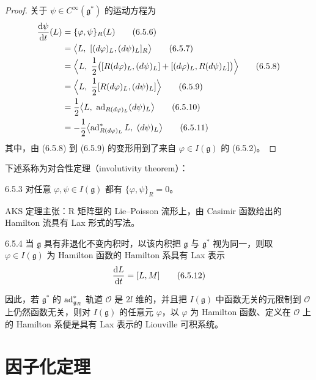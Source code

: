 \begin{proof}
  关于 $\psi\in C^\infty(\mathfrak{g}^*)$ 的运动方程为
  \begin{align}
    \frac{\rd\psi}{\rd t}(L) &= \{\varphi,\psi\}_R(L) \tag{6.5.6}\\
    &= \bigl\langle L,\ [(d\varphi)_L,(d\psi)_L]_R\bigr\rangle \tag{6.5.7}\\
    &= \Bigl\langle L,\ \frac{1}{2}\bigl([R(d\varphi)_L,(d\psi)_L] + [(d\varphi)_L,R(d\psi)_L]\bigr)\Bigr\rangle \tag{6.5.8}\\
    &= \Bigl\langle L,\ \frac{1}{2}[R(d\varphi)_L,(d\psi)_L]\Bigr\rangle \tag{6.5.9}\\
    &= \frac{1}{2}\bigl\langle L,\ \ad_{R(d\varphi)_L}(d\psi)_L\bigr\rangle \tag{6.5.10}\\
    &= -\frac{1}{2}\bigl\langle \ad^*_{R(d\varphi)_L}L,\ (d\psi)_L\bigr\rangle \tag{6.5.11}
  \end{align}
  其中，由 (6.5.8) 到 (6.5.9) 的变形用到了来自 $\varphi\in I(\mathfrak{g})$ 的 (6.5.2)。
\end{proof}

下述系称为对合性定理（involutivity theorem）：

\begin{corollary*}{6.5.3}
  对任意 $\varphi,\psi\in I(\mathfrak{g})$ 都有 $\{\varphi,\psi\}_R = 0$。
\end{corollary*}

AKS 定理主张：R 矩阵型的 Lie--Poisson 流形上，由 Casimir 函数给出的 Hamilton 流具有 Lax 形式的写法。

\begin{corollary*}{6.5.4}
  当 $\mathfrak{g}$ 具有非退化不变内积时，以该内积把 $\mathfrak{g}$ 与 $\mathfrak{g}^*$ 视为同一，则取 $\varphi\in I(\mathfrak{g})$ 为 Hamilton 函数的 Hamilton 系具有 Lax 表示
  \begin{equation}
    \frac{\mathrm{d} L}{\mathrm{d} t} = [L,M]
    \tag{6.5.12}
  \end{equation}
\end{corollary*}

因此，若 $\mathfrak{g}^*$ 的 $\operatorname{ad}^*_{\mathfrak{g}_R}$ 轨道 $\mathcal{O}$ 是 $2l$ 维的，并且把 $I(\mathfrak{g})$ 中函数无关的元限制到 $\mathcal{O}$ 上仍然函数无关，则对 $I(\mathfrak{g})$ 的任意元 $\varphi$，以 $\varphi$ 为 Hamilton 函数、定义在 $\mathcal{O}$ 上的 Hamilton 系便是具有 Lax 表示的 Liouville 可积系统。

\section{因子化定理}

